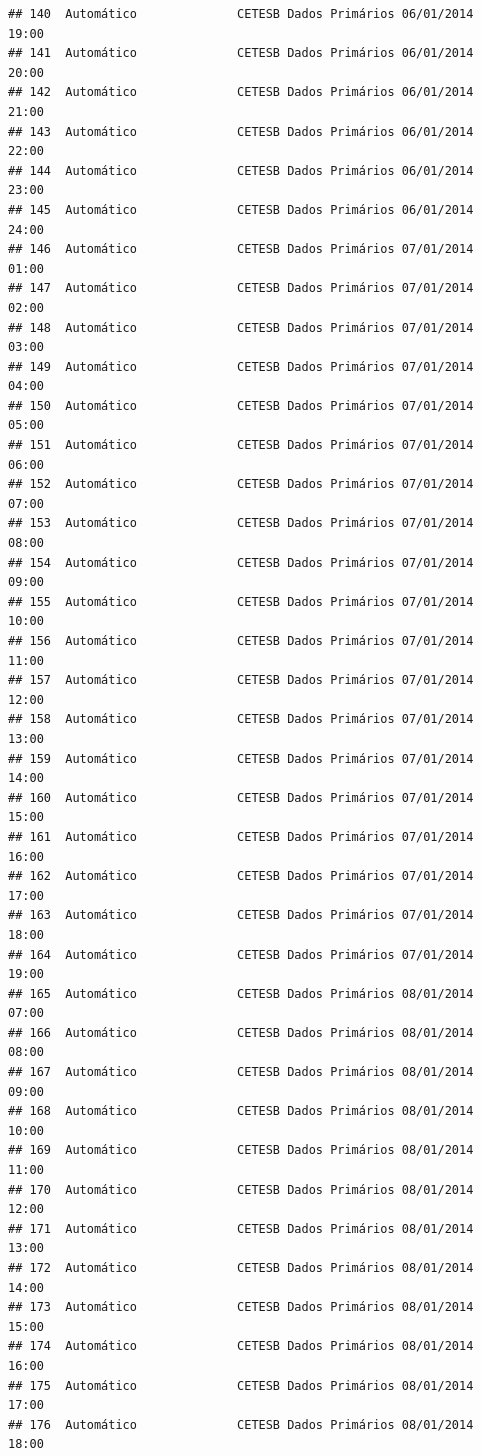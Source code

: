 \documentclass[]{book}
\begin{document}
\begin{verbatim}
## 140  Automático              CETESB Dados Primários 06/01/2014 19:00
## 141  Automático              CETESB Dados Primários 06/01/2014 20:00
## 142  Automático              CETESB Dados Primários 06/01/2014 21:00
## 143  Automático              CETESB Dados Primários 06/01/2014 22:00
## 144  Automático              CETESB Dados Primários 06/01/2014 23:00
## 145  Automático              CETESB Dados Primários 06/01/2014 24:00
## 146  Automático              CETESB Dados Primários 07/01/2014 01:00
## 147  Automático              CETESB Dados Primários 07/01/2014 02:00
## 148  Automático              CETESB Dados Primários 07/01/2014 03:00
## 149  Automático              CETESB Dados Primários 07/01/2014 04:00
## 150  Automático              CETESB Dados Primários 07/01/2014 05:00
## 151  Automático              CETESB Dados Primários 07/01/2014 06:00
## 152  Automático              CETESB Dados Primários 07/01/2014 07:00
## 153  Automático              CETESB Dados Primários 07/01/2014 08:00
## 154  Automático              CETESB Dados Primários 07/01/2014 09:00
## 155  Automático              CETESB Dados Primários 07/01/2014 10:00
## 156  Automático              CETESB Dados Primários 07/01/2014 11:00
## 157  Automático              CETESB Dados Primários 07/01/2014 12:00
## 158  Automático              CETESB Dados Primários 07/01/2014 13:00
## 159  Automático              CETESB Dados Primários 07/01/2014 14:00
## 160  Automático              CETESB Dados Primários 07/01/2014 15:00
## 161  Automático              CETESB Dados Primários 07/01/2014 16:00
## 162  Automático              CETESB Dados Primários 07/01/2014 17:00
## 163  Automático              CETESB Dados Primários 07/01/2014 18:00
## 164  Automático              CETESB Dados Primários 07/01/2014 19:00
## 165  Automático              CETESB Dados Primários 08/01/2014 07:00
## 166  Automático              CETESB Dados Primários 08/01/2014 08:00
## 167  Automático              CETESB Dados Primários 08/01/2014 09:00
## 168  Automático              CETESB Dados Primários 08/01/2014 10:00
## 169  Automático              CETESB Dados Primários 08/01/2014 11:00
## 170  Automático              CETESB Dados Primários 08/01/2014 12:00
## 171  Automático              CETESB Dados Primários 08/01/2014 13:00
## 172  Automático              CETESB Dados Primários 08/01/2014 14:00
## 173  Automático              CETESB Dados Primários 08/01/2014 15:00
## 174  Automático              CETESB Dados Primários 08/01/2014 16:00
## 175  Automático              CETESB Dados Primários 08/01/2014 17:00
## 176  Automático              CETESB Dados Primários 08/01/2014 18:00

\end{verbatim}
\end{document}
